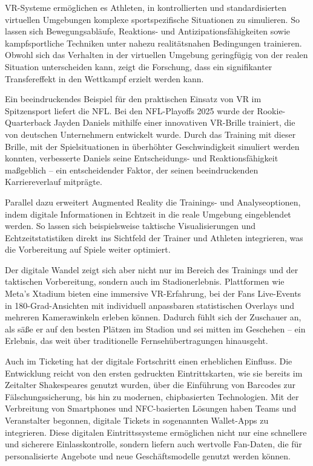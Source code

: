 \documentclass[
  number]{elsarticle}
\begin{document}
VR-Systeme ermöglichen es Athleten, in kontrollierten und
standardisierten virtuellen Umgebungen komplexe sportspezifische
Situationen zu simulieren. So lassen sich Bewegungsabläufe, Reaktions-
und Antizipationsfähigkeiten sowie kampfsportliche Techniken unter
nahezu realitätsnahen Bedingungen trainieren. Obwohl sich das Verhalten
in der virtuellen Umgebung geringfügig von der realen Situation
unterscheiden kann, zeigt die Forschung, dass ein signifikanter
Transfereffekt in den Wettkampf erzielt werden kann.
\citep[pp.~132-136]{memmert_sporttechnologie}

Ein beeindruckendes Beispiel für den praktischen Einsatz von VR im
Spitzensport liefert die NFL. Bei den NFL-Playoffs 2025 wurde der
Rookie-Quarterback Jayden Daniels mithilfe einer innovativen VR-Brille
trainiert, die von deutschen Unternehmern entwickelt wurde. Durch das
Training mit dieser Brille, mit der Spielsituationen in überhöhter
Geschwindigkeit simuliert werden konnten, verbesserte Daniels seine
Entscheidungs- und Reaktionsfähigkeit maßgeblich -- ein entscheidender
Faktor, der seinen beeindruckenden Karriereverlauf mitprägte.
\citep{ran_nflplayoffs}

Parallel dazu erweitert Augmented Reality die Trainings- und
Analyseoptionen, indem digitale Informationen in Echtzeit in die reale
Umgebung eingeblendet werden. So lassen sich beispielsweise taktische
Visualisierungen und Echtzeitstatistiken direkt ins Sichtfeld der
Trainer und Athleten integrieren, was die Vorbereitung auf Spiele weiter
optimiert. \citep[pp.~265--266]{memmert_sportinformatik}

Der digitale Wandel zeigt sich aber nicht nur im Bereich des Trainings
und der taktischen Vorbereitung, sondern auch im Stadionerlebnis.
Plattformen wie Meta's Xtadium bieten eine immersive VR-Erfahrung, bei
der Fans Live-Events in 180-Grad-Ansichten mit individuell anpassbaren
statistischen Overlays und mehreren Kamerawinkeln erleben können.
Dadurch fühlt sich der Zuschauer an, als säße er auf den besten Plätzen
im Stadion und sei mitten im Geschehen -- ein Erlebnis, das weit über
traditionelle Fernsehübertragungen hinausgeht.
\citep{sportspro_metaxtadium2025, xtadiumvr}

Auch im Ticketing hat der digitale Fortschritt einen erheblichen
Einfluss. Die Entwicklung reicht von den ersten gedruckten
Eintrittskarten, wie sie bereits im Zeitalter Shakespeares genutzt
wurden, über die Einführung von Barcodes zur Fälschungssicherung, bis
hin zu modernen, chipbasierten Technologien. Mit der Verbreitung von
Smartphones und NFC-basierten Lösungen haben Teams und Veranstalter
begonnen, digitale Tickets in sogenannten Wallet-Apps zu integrieren.
Diese digitalen Eintrittssysteme ermöglichen nicht nur eine schnellere
und sicherere Einlasskontrolle, sondern liefern auch wertvolle
Fan-Daten, die für personalisierte Angebote und neue Geschäftsmodelle
genutzt werden können. \citep{stadiumtechreport_ticketing}
\end{document}
